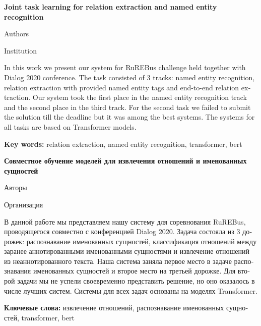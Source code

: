 \documentclass{dialogue}
\begin{document}
\begin{otherlanguage}{english}
\begin{center}
{\Large\bfseries{Joint task learning for relation extraction and named entity recognition}}

\medskip

Authors

\medskip

Institution
\end{center}

In this work we present our system for RuREBus challenge held together with Dialog 2020 conference. The task consisted of 3 tracks: named entity recognition, relation extraction with provided named entity tags and end-to-end relation extraction. Our system took the first place in the named entity recognition track and the second place in the third track. For the second task we failed to submit the solution till the deadline but it was among the best systems. The systems for all tasks are based on Transformer models.

\textbf{Key words:} relation extraction, named entity recognition, transformer, bert
\end{otherlanguage}

\bigskip

\begin{otherlanguage}{russian}
\begin{center}
{\Large\bfseries{Совместное обучение моделей для извлечения отношений и именованных сущностей}}

\medskip

Авторы

\medskip

Организация
\end{center}

В данной работе мы представляем нашу систему для соревнования RuREBus, проводящегося совместно с конференцией Dialog 2020. Задача состояла из 3 дорожек: распознавание именованных сущностей, классификация отношений между заранее аннотированными именованными сущностями и извлечение отношений из неаннотированного текста. Наша система заняла первое место в задаче распознавания именованных сущностей и второе место на третьей дорожке. Для второй задачи мы не успели своевременно представить решение, но оно оказалось в числе лучших систем. Системы для всех задач основаны на моделях Transformer.
\medskip

\textbf{Ключевые слова:} извлечение отношений, распознавание именованных сущностей, transformer, bert
\end{otherlanguage}
\end{document}
